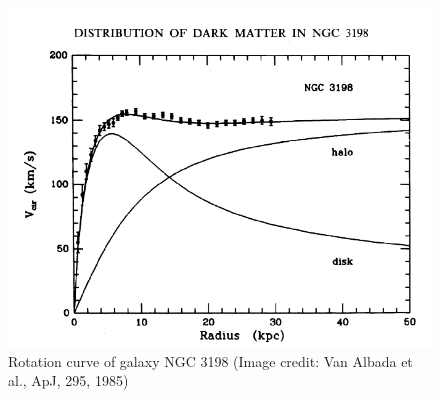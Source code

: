 \documentclass[11pt, a4paper,oneside,openright]{book}
\numberwithin{equation}{section}
\begin{document}
\begin{figure}[ht]
\begin{center}
\includegraphics[scale=0.55]{Draw/lec10_4.png}
\end{center}
\caption{Rotation curve of galaxy NGC 3198 (Image credit: Van Albada et al., ApJ, 295, 1985)}
\label{fig:lec10_4}
\end{figure}
\end{document}
